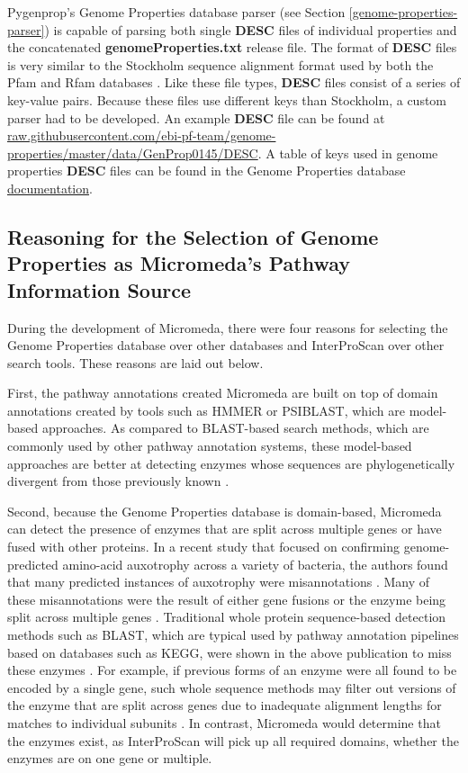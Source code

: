 Pygenprop's Genome Properties database parser (see Section \ref{genome-properties-parser}) is capable of parsing both single \textbf{DESC} files of individual properties and the concatenated \textbf{genomeProperties.txt} release file. The format of \textbf{DESC} files is very similar to the Stockholm sequence alignment format used by both the Pfam and Rfam databases \cite{bateman2004pfam, griffiths2003rfam}. Like these file types, \textbf{DESC} files consist of a series of key-value pairs. Because these files use different keys than Stockholm, a custom parser had to be developed. An example \textbf{DESC} file can be found at \href{raw.githubusercontent.com/ebi-pf-team/genome-properties/master/data/GenProp0145/DESC}{raw.githubusercontent.com/ebi-pf-team/genome-properties/master/data/GenProp0145/DESC}. A table of keys used in  genome properties \textbf{DESC} files can be found in the Genome Properties database \href{genome-properties.readthedocs.io/en/latest/flatfile.html\#desc-file}{documentation}.

\subsection{Reasoning for the Selection of Genome Properties as Micromeda's Pathway Information Source} \label{reason-for-genome-properties-selection}

During the development of Micromeda, there were four reasons for selecting the Genome Properties database over other databases and InterProScan over other search tools. These reasons are laid out below.

First, the pathway annotations created Micromeda are built on top of domain annotations created by tools such as HMMER or PSIBLAST, which are model-based approaches. As compared to BLAST-based search methods, which are commonly used by other pathway annotation systems, these model-based approaches are better at detecting enzymes whose sequences are phylogenetically divergent from those previously known \cite{eddy2011accelerated}.

Second, because the Genome Properties database is domain-based, Micromeda can detect the presence of enzymes that are split across multiple genes or have fused with other proteins. In a recent study that focused on confirming genome-predicted amino-acid auxotrophy across a variety of bacteria, the authors found that many predicted instances of auxotrophy were misannotations \cite{price2018filling}. Many of these misannotations were the result of either gene fusions or the enzyme being split across multiple genes \cite{price2018filling}. Traditional whole protein sequence-based detection methods such as BLAST, which are typical used by pathway annotation pipelines based on databases such as KEGG, were shown in the above publication to miss these enzymes \cite{price2018filling}. For example, if previous forms of an enzyme were all found to be encoded by a single gene, such whole sequence methods may filter out versions of the enzyme that are split across genes due to inadequate alignment lengths for matches to individual subunits \cite{price2018filling}. In contrast, Micromeda would determine that the enzymes exist, as InterProScan will pick up all required domains, whether the enzymes are on one gene or multiple.

